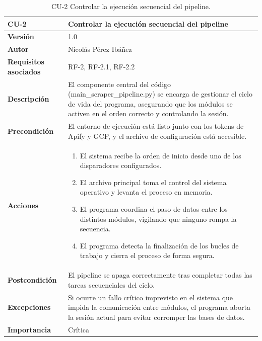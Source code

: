 \begin{table}[p]
	\centering
	\begin{tabularx}{\linewidth}{ p{} p{} }
		\toprule
		\textbf{CU-2}    & \textbf{Controlar la ejecución secuencial del pipeline}\\
		\toprule
		\textbf{Versión}              & 1.0    \\
		\textbf{Autor}                & Nicolás Pérez Ibáñez \\
		\textbf{Requisitos asociados} & RF-2, RF-2.1, RF-2.2 \\
		\textbf{Descripción}          & El componente central del código (main\_scraper\_pipeline.py) se encarga de gestionar el ciclo de vida del programa, asegurando que los módulos se activen en el orden correcto y controlando la sesión. \\
		\textbf{Precondición}         & El entorno de ejecución está listo junto con los tokens de Apify y GCP, y el archivo de configuración está accesible. \\
		\textbf{Acciones}             &
		\begin{enumerate}
			\def\labelenumi{\arabic{enumi}.}
			\tightlist
			\item El sistema recibe la orden de inicio desde uno de los disparadores configurados.
			\item El archivo principal toma el control del sistema operativo y levanta el proceso en memoria.
			\item El programa coordina el paso de datos entre los distintos módulos, vigilando que ninguno rompa la secuencia.
			\item El programa detecta la finalización de los bucles de trabajo y cierra el proceso de forma segura.
		\end{enumerate}\\
		\textbf{Postcondición}        & El pipeline se apaga correctamente tras completar todas las tareas secuenciales del ciclo. \\
		\textbf{Excepciones}          & Si ocurre un fallo crítico imprevisto en el sistema que impida la comunicación entre módulos, el programa aborta la sesión actual para evitar corromper las bases de datos. \\
		\textbf{Importancia}          & Crítica \\
		\bottomrule
	\end{tabularx}
	\caption{CU-2 Controlar la ejecución secuencial del pipeline.}
\end{table}


